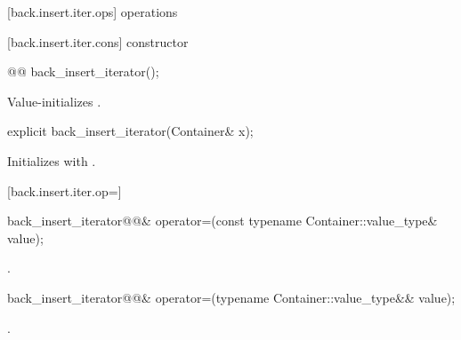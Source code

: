 [back.insert.iter.ops]{ operations}

[back.insert.iter.cons]{ constructor}

%
\begin{addedblock}
\begin{itemdecl}
@@ back_insert_iterator();
\end{itemdecl}

\begin{itemdescr}
\pnum
\effects
Value-initializes
.
\end{itemdescr}
\end{addedblock}

%

\begin{itemdecl}
explicit back_insert_iterator(Container& x);
\end{itemdecl}

\begin{itemdescr}
\pnum
\effects
Initializes
with .
\end{itemdescr}

[back.insert.iter.op=]{}

%
\begin{itemdecl}
back_insert_iterator@@&
  operator=(const typename Container::value_type& value);
\end{itemdecl}

\begin{itemdescr}
\pnum
\effects {}

\pnum
\returns
{}.
\end{itemdescr}

%
\begin{itemdecl}
back_insert_iterator@@&
  operator=(typename Container::value_type&& value);
\end{itemdecl}

\begin{itemdescr}
\pnum
\effects {}

\pnum
\returns
{}.
\end{itemdescr}

